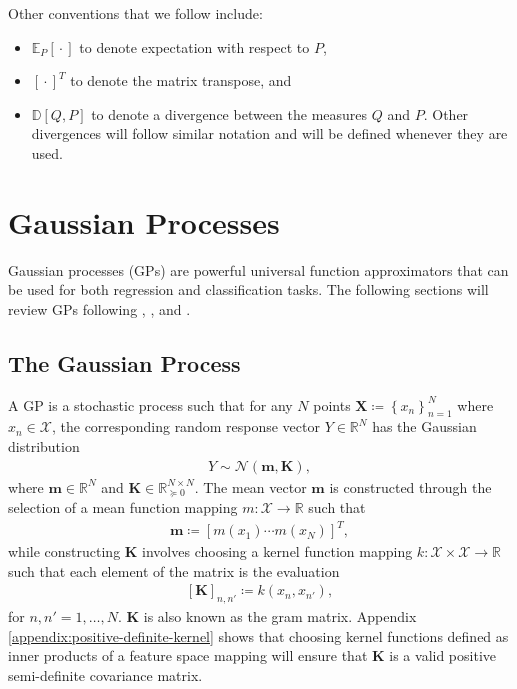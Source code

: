 \documentclass{article}
\newcommand{\wc}{\operatorname{{}\cdot{}}}
\numberwithin{equation}{section}
\begin{document}
Other conventions that we follow include:
\begin{itemize}
    \setlength\itemsep{-0.25em}
    \item $\mathbb{E}_{P}[\wc]$ to denote expectation with respect to $P$,
    \item $\left[\wc\right]^T$ to denote the matrix transpose, and 
    \item $\mathbb{D}[Q, P]$ to denote a divergence between the measures $Q$ and $P$. Other divergences will follow similar notation and will be defined whenever they are used.
\end{itemize}
 



\newpage
\section{Gaussian Processes}\label{section:gaussian-processes}
Gaussian processes (GPs) are powerful universal function approximators that can be used for both regression and classification tasks. The following sections will review GPs following \cite{rasmussen2003gaussian}, \cite{matthews2017scalable}, and \cite{wild2022generalized}.

\subsection{The Gaussian Process}\label{section:the-gp}
A GP is a stochastic process such that for any $N$ points $\mathbf{X} \coloneqq \left\{ x_n\right\}_{n=1}^N$ where $x_n \in \mathcal{X}$, the corresponding random response vector $Y \in \mathbb{R}^N$ has the Gaussian distribution
\begin{align}
    \label{gp-vector}
    Y \sim \mathcal{N}\left(\mathbf{m}, \mathbf{K}\right),
\end{align}
where $\mathbf{m} \in \mathbb{R}^N$ and $\mathbf{K} \in  \mathbb{R}^{N \times N}_{\succcurlyeq 0}$.
The mean vector $\mathbf{m}$ is constructed through the selection of a mean function mapping $m: \mathcal{X} \rightarrow \mathbb{R}$ such that
\begin{align}
    \label{gp-mean-vector}
    \mathbf{m} \coloneqq \left[ m(x_1) \cdots m(x_N)\right]^T,
\end{align}
while constructing $\mathbf{K}$ involves choosing a kernel function mapping $k: \mathcal{X} \times \mathcal{X} \rightarrow \mathbb{R}$ such that each element of the matrix is the evaluation
\begin{align}
    \label{gp-kernel-matrix}
    \left[\mathbf{K}\right]_{n, n'} \coloneqq k(x_n, x_{n'}),
\end{align}
for $n, n'=1,\dots, N$.
$\mathbf{K}$ is also known as the gram matrix.
Appendix \ref{appendix:positive-definite-kernel} shows that choosing kernel functions defined as inner products of a feature space mapping will ensure that $\mathbf{K}$ is a valid positive semi-definite covariance matrix.
\end{document}
